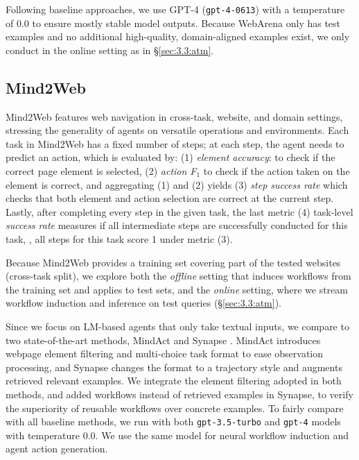 Following baseline approaches, we use GPT-4 (\texttt{gpt-4-0613}) with a temperature of $0.0$ to ensure mostly stable model outputs.
Because WebArena only has test examples and no additional high-quality, domain-aligned examples exist, we only conduct \awm in the online setting as in \S\ref{sec:3.3:atm}.



\subsection{Mind2Web}
\label{sec:4.2:mind2web}

Mind2Web \citep{deng2023mindweb} features web navigation in cross-task, website, and domain settings, stressing the generality of agents on versatile operations and environments. 
Each task in Mind2Web has a fixed number of steps; at each step, the agent needs to predict an action, which is evaluated by: (1) \textit{element accuracy}: to check if the correct page element is selected, (2) \textit{action F$_1$} to check if the action taken on the element is correct, and aggregating (1) and (2) yields (3) \textit{step success rate} which checks that both element and action selection are correct at the current step. Lastly, after completing every step in the given task, the last metric (4) task-level \textit{success rate} measures if all intermediate steps are successfully conducted for this task, \ie, all steps for this task score 1 under metric (3).

Because Mind2Web provides a training set covering part of the tested websites (cross-task split), we explore both the \textit{offline} setting that induces workflows from the training set and applies to test sets, and the \textit{online} setting, where we stream workflow induction and inference on test queries (\S\ref{sec:3.3:atm}).

Since we focus on LM-based agents that only take textual inputs, we compare \awm to two state-of-the-art methods, MindAct \citep{deng2023mindweb} and Synapse \citep{zheng2024synapse}. MindAct introduces webpage element filtering and multi-choice task format to ease observation processing, and Synapse changes the format to a trajectory style and augments retrieved relevant examples. We integrate the element filtering adopted in both methods, and added workflows instead of retrieved examples in Synapse, to verify the superiority of reusable workflows over concrete examples. To fairly compare with all baseline methods, we run \awm with both \texttt{gpt-3.5-turbo} and \texttt{gpt-4} models with temperature $0.0$. We use the same model for neural workflow induction and agent action generation.



